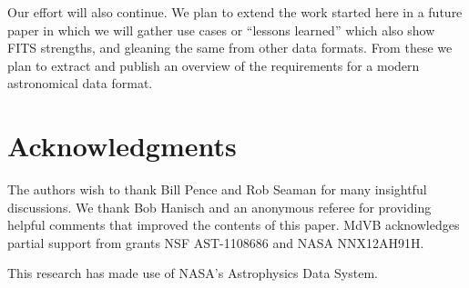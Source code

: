 \documentclass[final,authoryear,5p,times,twocolumn]{elsarticle}
\begin{document}
{{Our effort will also continue. We plan to extend the work started
here in a future paper in which we will gather use cases or ``lessons learned''
which also show FITS strengths, and gleaning the same from other data formats.
From these we plan to extract and publish an overview of the requirements for
a modern astronomical data format.




\section{Acknowledgments}

The authors wish to thank Bill Pence and Rob Seaman for many insightful
discussions.  We thank Bob Hanisch and an anonymous referee for providing
helpful comments that improved the contents of this paper.
MdVB acknowledges partial support from grants NSF AST-1108686 and NASA
NNX12AH91H.

This research has made use of NASA's Astrophysics Data System.




}}
\end{document}
